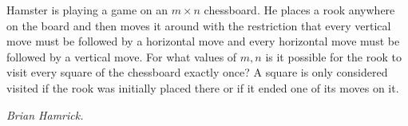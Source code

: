 Hamster is playing a game on an $m \times n$ chessboard. He places a rook anywhere on the board and then moves it around with the restriction that every vertical move must be followed by a horizontal move and every horizontal move must be followed by a vertical move. For what values of $m,n$ is it possible for the rook to visit every square of the chessboard exactly once? A square is only considered visited if the rook was initially placed there or if it ended one of its moves on it.

\textit{Brian Hamrick.}
